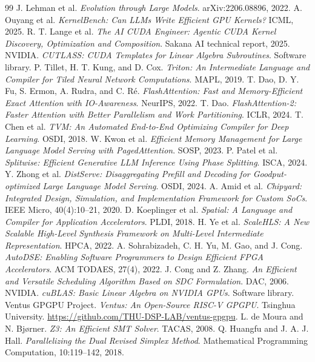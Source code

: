 \documentclass[11pt]{article}
\begin{document}
\begin{thebibliography}{99}
 J. Lehman et al. \emph{Evolution through Large Models}. arXiv:2206.08896, 2022.
 A. Ouyang et al. \emph{KernelBench: Can LLMs Write Efficient GPU Kernels?} ICML, 2025.
 R. T. Lange et al. \emph{The AI CUDA Engineer: Agentic CUDA Kernel Discovery, Optimization and Composition}. Sakana AI technical report, 2025.
 NVIDIA. \emph{CUTLASS: CUDA Templates for Linear Algebra Subroutines}. Software library.
 P. Tillet, H. T. Kung, and D. Cox. \emph{Triton: An Intermediate Language and Compiler for Tiled Neural Network Computations}. MAPL, 2019.
 T. Dao, D. Y. Fu, S. Ermon, A. Rudra, and C. Ré. \emph{FlashAttention: Fast and Memory-Efficient Exact Attention with IO-Awareness}. NeurIPS, 2022.
 T. Dao. \emph{FlashAttention-2: Faster Attention with Better Parallelism and Work Partitioning}. ICLR, 2024.
 T. Chen et al. \emph{TVM: An Automated End-to-End Optimizing Compiler for Deep Learning}. OSDI, 2018.
 W. Kwon et al. \emph{Efficient Memory Management for Large Language Model Serving with PagedAttention}. SOSP, 2023.
 P. Patel et al. \emph{Splitwise: Efficient Generative LLM Inference Using Phase Splitting}. ISCA, 2024.
 Y. Zhong et al. \emph{DistServe: Disaggregating Prefill and Decoding for Goodput-optimized Large Language Model Serving}. OSDI, 2024.
 A. Amid et al. \emph{Chipyard: Integrated Design, Simulation, and Implementation Framework for Custom SoCs}. IEEE Micro, 40(4):10--21, 2020.
 D. Koeplinger et al. \emph{Spatial: A Language and Compiler for Application Accelerators}. PLDI, 2018.
 H. Ye et al. \emph{ScaleHLS: A New Scalable High-Level Synthesis Framework on Multi-Level Intermediate Representation}. HPCA, 2022.
 A. Sohrabizadeh, C. H. Yu, M. Gao, and J. Cong. \emph{AutoDSE: Enabling Software Programmers to Design Efficient FPGA Accelerators}. ACM TODAES, 27(4), 2022.
 J. Cong and Z. Zhang. \emph{An Efficient and Versatile Scheduling Algorithm Based on SDC Formulation}. DAC, 2006.
 NVIDIA. \emph{cuBLAS: Basic Linear Algebra on NVIDIA GPUs}. Software library.
 Ventus GPGPU Project. \emph{Ventus: An Open-Source RISC-V GPGPU}. Tsinghua University. \url{https://github.com/THU-DSP-LAB/ventus-gpgpu}.
 L. de Moura and N. Bjørner. \emph{Z3: An Efficient SMT Solver}. TACAS, 2008.
 Q. Huangfu and J. A. J. Hall. \emph{Parallelizing the Dual Revised Simplex Method}. Mathematical Programming Computation, 10:119--142, 2018.

\end{thebibliography}
\end{document}
